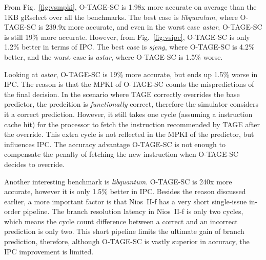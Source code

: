 
From Fig.~\ref{fig:vsmpki}, \mbox{O-TAGE-SC} is 1.98x more accurate on average than the 1KB gRselect over all the benchmarks. The best case is \textit{libquantum}, where \mbox{O-TAGE-SC} is 239.9x more accurate, and even in the worst case \textit{astar}, \mbox{O-TAGE-SC} is still 19\% more accurate. However, from Fig.~\ref{fig:vsipc}, \mbox{O-TAGE-SC} is only 1.2\% better in terms of IPC. The best case is \textit{sjeng}, where \mbox{O-TAGE-SC} is 4.2\% better, and the worst case is \textit{astar}, where \mbox{O-TAGE-SC} is 1.5\% worse.

Looking at \textit{astar}, \mbox{O-TAGE-SC} is 19\% more accurate, but ends up 1.5\% worse in IPC. The reason is that the MPKI of \mbox{O-TAGE-SC} counts the mispredictions of the final decision. In the scenario where TAGE correctly overrides the base predictor, the predcition is \textit{functionally} correct, therefore the simulator considers it a correct prediction. However, it still takes one cycle (assuming a instruction cache hit) for the processor to fetch the instruction recommended by TAGE after the override. This extra cycle is not reflected in the MPKI of the predictor, but influences IPC. The accuracy advantage \mbox{O-TAGE-SC} is not enough to compensate the penalty of fetching the new instruction when \mbox{O-TAGE-SC} decides to override.

Another interesting benchmark is \textit{libquantum}. \mbox{O-TAGE-SC} is \mytilde240x more accurate, however it is only 1.5\% better in IPC. Besides the reason discussed earlier, a more important factor is that Nios~II-f has a very short single-issue in-order pipeline. The branch resolution latency in Nios~II-f is only two cycles, which means the cycle count difference between a correct and an incorrect prediction is only two. This short pipeline limits the ultimate gain of branch prediction, therefore, although \mbox{O-TAGE-SC} is vastly superior in accuracy, the IPC improvement is limited.











